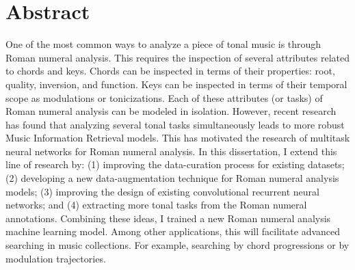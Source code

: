 \chapter*{Abstract}
\label{chap:abstract-en}

One of the most common ways to analyze a piece of tonal
music is through Roman numeral analysis. This requires the
inspection of several attributes related to chords and keys.
Chords can be inspected in terms of their properties: root,
quality, inversion, and function. Keys can be inspected in
terms of their temporal scope as modulations or
tonicizations. Each of these attributes (or tasks) of Roman
numeral analysis can be modeled in isolation. However,
recent research has found that analyzing several tonal tasks
simultaneously leads to more robust Music Information
Retrieval models. This has motivated the research of
multitask neural networks for Roman numeral analysis. In
this dissertation, I extend this line of research by: (1)
improving the data-curation process for existing datasets;
(2) developing a new data-augmentation technique for Roman
numeral analysis models; (3) improving the design of
existing convolutional recurrent neural networks; and (4)
extracting more tonal tasks from the Roman numeral
annotations. Combining these ideas, I trained a new Roman
numeral analysis machine learning model. Among other
applications, this will facilitate advanced searching in
music collections. For example, searching by chord
progressions or by modulation trajectories.